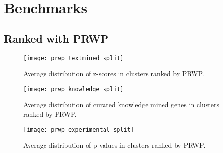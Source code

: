 \section{Benchmarks}
\subsection{Ranked with PRWP}
\begin{figure}
    \label{fig:txt-iref-prwp}
    \texttt{[image: prwp\_textmined\_split]}
    \caption{Average distribution of z-scores in clusters ranked by PRWP.}
\end{figure}
\begin{figure}
    \label{fig:know-iref-prwp}
    \texttt{[image: prwp\_knowledge\_split]}
    \caption{Average distribution of curated knowledge mined genes in clusters
    ranked by PRWP.}
\end{figure}
\begin{figure}
    \label{fig:exp-iref-prwp}
    \texttt{[image: prwp\_experimental\_split]}
    \caption{Average distribution of p-values in clusters ranked by PRWP.}
\end{figure}
